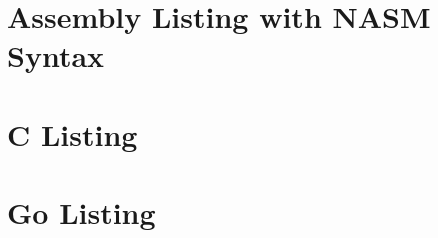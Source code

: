 \documentclass[12pt, a4paper]{article}
\begin{document}
\section{Assembly Listing with NASM Syntax}



\section{C Listing}



\pagebreak

\section{Go Listing}


\end{document}
